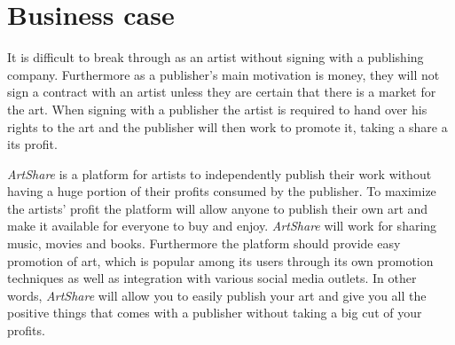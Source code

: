 \documentclass[../report.tex]{subfiles}
\begin{document}
\section{Business case}
It is difficult to break through as an artist without signing with a publishing company. Furthermore as a publisher's main motivation is money, they will not sign a contract with an artist unless they are certain that there is a market for the art. When signing with a publisher the artist is required to hand over his rights to the art and the publisher will then work to promote it, taking a share a its profit.



\noindent \textit{ArtShare} is a platform for artists to independently publish their work without having a huge portion of their profits consumed by the publisher. To maximize the artists' profit the platform will allow anyone to publish their own art and make it available for everyone to buy and enjoy. \textit{ArtShare} will work for sharing music, movies and books. Furthermore the platform should provide easy promotion of art, which is popular among its users through its own promotion techniques as well as integration with various social media outlets. In other words, \textit{ArtShare} will allow you to easily publish your art and give you all the positive things that comes with a publisher without taking a big cut of your profits. 

\end{document}
